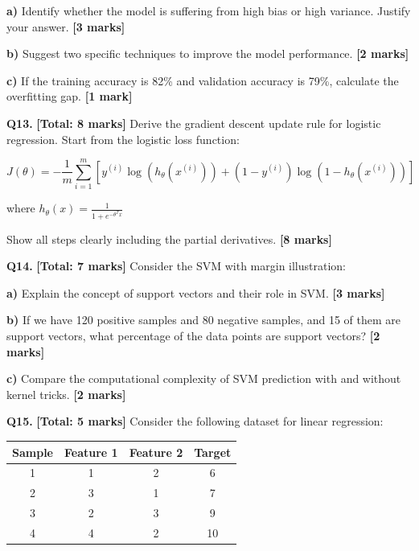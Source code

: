 \documentclass{article}
\begin{document}
\textbf{a)} Identify whether the model is suffering from high bias or high variance. Justify your answer. \textbf{[3 marks]}

\textbf{b)} Suggest two specific techniques to improve the model performance. \textbf{[2 marks]}

\textbf{c)} If the training accuracy is 82\% and validation accuracy is 79\%, calculate the overfitting gap. \textbf{[1 mark]}


\textbf{Q13.} \textbf{[Total: 8 marks]} Derive the gradient descent update rule for logistic regression. Start from the logistic loss function:

$$J(\theta) = -\frac{1}{m} \sum_{i=1}^{m} [y^{(i)} \log(h_\theta(x^{(i)})) + (1-y^{(i)}) \log(1-h_\theta(x^{(i)}))]$$

where $h_\theta(x) = \frac{1}{1 + e^{-\theta^T x}}$

Show all steps clearly including the partial derivatives. \textbf{[8 marks]}


\textbf{Q14.} \textbf{[Total: 7 marks]} Consider the SVM with margin illustration:

\begin{center}

\end{center}

\textbf{a)} Explain the concept of support vectors and their role in SVM. \textbf{[3 marks]}

\textbf{b)} If we have 120 positive samples and 80 negative samples, and 15 of them are support vectors, what percentage of the data points are support vectors? \textbf{[2 marks]}

\textbf{c)} Compare the computational complexity of SVM prediction with and without kernel tricks. \textbf{[2 marks]}


\textbf{Q15.} \textbf{[Total: 5 marks]} Consider the following dataset for linear regression:

\begin{center}
\begin{tabular}{|c|c|c|c|}
\hline
\textbf{Sample} & \textbf{Feature 1} & \textbf{Feature 2} & \textbf{Target} \\
\hline
1 & 1 & 2 & 6 \\
\hline
2 & 3 & 1 & 7 \\
\hline
3 & 2 & 3 & 9 \\
\hline
4 & 4 & 2 & 10 \\
\hline
\end{tabular}
\end{center}
\end{document}
